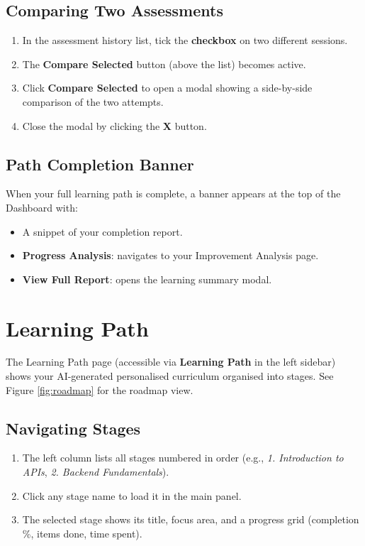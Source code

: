 \documentclass{FastFyp}
\begin{document}
\subsection{Comparing Two Assessments}
\begin{enumerate}
    \item In the assessment history list, tick the \textbf{checkbox} on two different sessions.
    \item The \textbf{Compare Selected} button (above the list) becomes active.
    \item Click \textbf{Compare Selected} to open a modal showing a side-by-side comparison of the two attempts.
    \item Close the modal by clicking the \textbf{X} button.
\end{enumerate}

\subsection{Path Completion Banner}
When your full learning path is complete, a banner appears at the top of the Dashboard with:
\begin{itemize}
    \item A snippet of your completion report.
    \item \textbf{Progress Analysis}: navigates to your Improvement Analysis page.
    \item \textbf{View Full Report}: opens the learning summary modal.
\end{itemize}

\section{Learning Path}

The Learning Path page (accessible via \textbf{Learning Path} in the left sidebar) shows your AI-generated personalised curriculum organised into stages. See Figure \ref{fig:roadmap} for the roadmap view.

\subsection{Navigating Stages}
\begin{enumerate}
    \item The left column lists all stages numbered in order (e.g., \textit{1. Introduction to APIs}, \textit{2. Backend Fundamentals}).
    \item Click any stage name to load it in the main panel.
    \item The selected stage shows its title, focus area, and a progress grid (completion \%, items done, time spent).
\end{enumerate}
\end{document}
